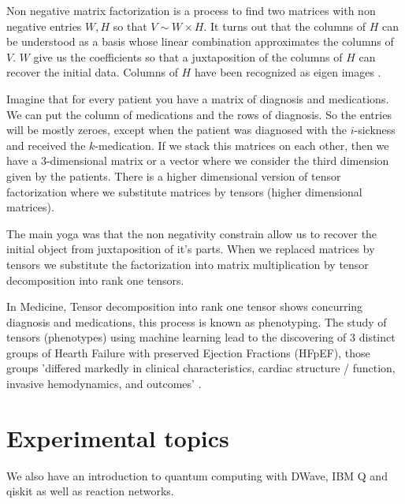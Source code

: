 \documentclass[11pt,letterpaper]{report}
\begin{document}
Non negative matrix factorization is a process to find two matrices with non negative entries $W,H$ so that $V\sim W\times H$. It turns out that the columns of $H$ can be understood as a basis whose linear combination approximates the columns of $V$. $W$ give us the coefficients so that a juxtaposition of the columns of  $H$ can recover the initial data. Columns of $H$ have been recognized as eigen images \cite{Lee1999}.  
 
 

Imagine that for every patient you have a matrix of diagnosis and medications. We can put the column of medications and the rows of diagnosis. So the entries will be mostly zeroes, except when the patient was diagnosed with the $i$-sickness and received the $k$-medication. If we stack this matrices on each other, then we have a 3-dimensional matrix or a vector where we consider the third dimension given by the patients. There is a higher dimensional version of tensor factorization  where we substitute  matrices by tensors (higher dimensional matrices). 
 
The main yoga was that the non negativity constrain allow us to recover the initial object from juxtaposition of it's parts. When we  replaced matrices by tensors we substitute the factorization into matrix multiplication by tensor decomposition into rank one tensors. 
 
 
In Medicine, Tensor decomposition into rank one tensor shows concurring diagnosis and medications, this process is known as phenotyping\cite{Ho}.  The study of tensors (phenotypes) using machine learning lead to the discovering of 3 distinct groups of Hearth Failure with preserved Ejection Fractions (HFpEF), those groups 'differed markedly in clinical characteristics, cardiac structure / function, invasive hemodynamics, and outcomes' \cite{Shah2015}.
 
 

			
		

\section{Experimental topics}
	We also have an introduction to quantum computing with DWave, IBM Q and qiskit as well as reaction networks.
	
	
	
	
	
	
\end{document}
